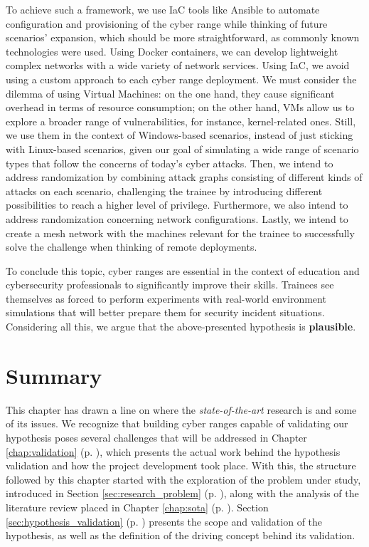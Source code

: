 To achieve such a framework, we use IaC tools like Ansible to automate configuration and provisioning of the cyber range while thinking of future scenarios' expansion, which should be more straightforward, as commonly known technologies were used. Using Docker containers, we can develop lightweight complex networks with a wide variety of network services. Using IaC, we avoid using a custom approach to each cyber range deployment. We must consider the dilemma of using Virtual Machines: on the one hand, they cause significant overhead in terms of resource consumption; on the other hand, VMs allow us to explore a broader range of vulnerabilities, for instance, kernel-related ones. Still, we use them in the context of Windows-based scenarios, instead of just sticking with Linux-based scenarios, given our goal of simulating a wide range of scenario types that follow the concerns of today's cyber attacks. Then, we intend to address randomization by combining attack graphs consisting of different kinds of attacks on each scenario, challenging the trainee by introducing different possibilities to reach a higher level of privilege. Furthermore, we also intend to address randomization concerning network configurations. Lastly, we intend to create a mesh network with the machines relevant for the trainee to successfully solve the challenge when thinking of remote deployments.

To conclude this topic, cyber ranges are essential in the context of education and cybersecurity professionals to significantly improve their skills. Trainees see themselves as forced to perform experiments with real-world environment simulations that will better prepare them for security incident situations. Considering all this, we argue that the above-presented hypothesis is \textbf{plausible}.

\section{Summary} \label{sec:problem_summary}

This chapter has drawn a line on where the \textit{state-of-the-art} research is and some of its issues. We recognize that building cyber ranges capable of validating our hypothesis poses several challenges that will be addressed in Chapter \ref{chap:validation} (p. \pageref{chap:validation}), which presents the actual work behind the hypothesis validation and how the project development took place. With this, the structure followed by this chapter started with the exploration of the problem under study, introduced in Section \ref{sec:research_problem} (p. \pageref{sec:research_problem}), along with the analysis of the literature review placed in Chapter \ref{chap:sota} (p. \pageref{chap:sota}). Section \ref{sec:hypothesis_validation} (p. \pageref{sec:hypothesis_validation}) presents the scope and validation of the hypothesis, as well as the definition of the driving concept behind its validation.